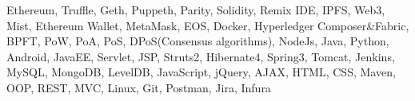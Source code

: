 \vspace{-0.5em}
\vspace{-1.5em}
\begin{cventries}
  \cventry
    {}
    {}
    {}{}
    {
      \begin{cvitems}
        \item {Ethereum, Truffle, Geth, Puppeth, Parity, Solidity, Remix IDE, IPFS, Web3, Mist, Ethereum Wallet, MetaMask, EOS, Docker, Hyperledger Composer\&Fabric, BPFT, PoW, PoA, PoS, DPoS(Consensus algorithms), NodeJs, Java, Python, Android, JavaEE, Servlet, JSP, Struts2, Hibernate4, Spring3, Tomcat, Jenkins, MySQL, MongoDB, LevelDB, JavaScript, jQuery, AJAX, HTML, CSS, Maven, OOP, REST, MVC, Linux, Git, Postman, Jira, Infura}         
      \end{cvitems}
    }
    
\end{cventries}
